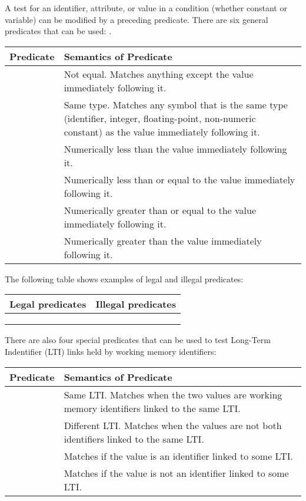 A test for an identifier, attribute, or value in a condition (whether
constant or variable) can be modified by a preceding predicate. There
are six general predicates that can be used:
\soar{<>, <=>, <, <=, >=, >}.  

\begin{tabularx}{\textwidth}{| l | X |} \hline
\bf{Predicate} &  \bf{Semantics of Predicate} \\ \hline
\soar{<>}  & Not equal. Matches anything except the value immediately following it. \\
\soar{<=>} & Same type.  Matches any symbol that is the same type (identifier, 
             integer, floating-point, non-numeric constant) as the value 
             immediately following it. \\
\soar{<}   & Numerically less than the value immediately following it. \\
\soar{<=}  & Numerically less than or equal to the value immediately 
             following it. \\
\soar{>=}  & Numerically greater than or equal to the value immediately 
             following it. \\
\soar{>}   & Numerically greater than the value immediately following it. \\  
\hline 
\end{tabularx} \vspace{10pt}

The following table shows examples of legal and illegal predicates:

\begin{tabular}{| l | l |} \hline
	\bf{Legal predicates} &  \bf{Illegal predicates} \\ \hline
	\soar{> <valuex>} & \soar{> > <valuey>} \\
	\soar{< 1}  & \soar{1 >} \\
	\soar{<=> <y>} & \soar{= 10} \\  \hline
\end{tabular} \vspace{10pt}

There are also four special predicates that can be used to test Long-Term Indentifier (LTI) links
held by working memory identifiers:

\begin{tabularx}{\textwidth}{| l | X |} \hline
	\bf{Predicate} &  \bf{Semantics of Predicate} \\ \hline
	\soar{@}  & Same LTI. Matches when the two values are working memory identifiers linked to the same LTI. \\
	\soar{!@} & Different LTI.  Matches when the values are not both identifiers linked to the same LTI. \\
	\soar{@+} & Matches if the value is an identifier linked to some LTI. \\
	\soar{@-} & Matches if the value is not an identifier linked to some LTI. \\
	\hline 
\end{tabularx} 
\vspace{10pt}

